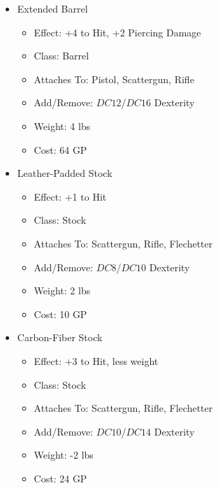 \documentclass[12pt, landscape]{article}
\begin{document}
\begin{FlushLeft}
\begin{multicols}{2}
			\begin{itemize}
				\item Extended Barrel
				\begin{itemize}
					\item Effect: +4 to Hit, +2 Piercing Damage
					\item Class: Barrel
					\item Attaches To: Pistol, Scattergun, Rifle
					\item Add/Remove: $DC12$/$DC16$ Dexterity
					\item Weight: 4 lbs
					\item Cost: 64 GP
				\end{itemize}
				\item Leather-Padded Stock
				\begin{itemize}
					\item Effect: +1 to Hit
					\item Class: Stock
					\item Attaches To: Scattergun, Rifle, Flechetter
					\item Add/Remove: $DC8$/$DC10$ Dexterity
					\item Weight: 2 lbs
					\item Cost: 10 GP
				\end{itemize}
				\item Carbon-Fiber Stock
				\begin{itemize}
					\item Effect: +3 to Hit, less weight
					\item Class: Stock
					\item Attaches To: Scattergun, Rifle, Flechetter
					\item Add/Remove: $DC10$/$DC14$ Dexterity
					\item Weight: -2 lbs
					\item Cost: 24 GP
				\end{itemize}
			\end{itemize}
			\vfill \pagebreak


\end{multicols}
\end{FlushLeft}
\end{document}
